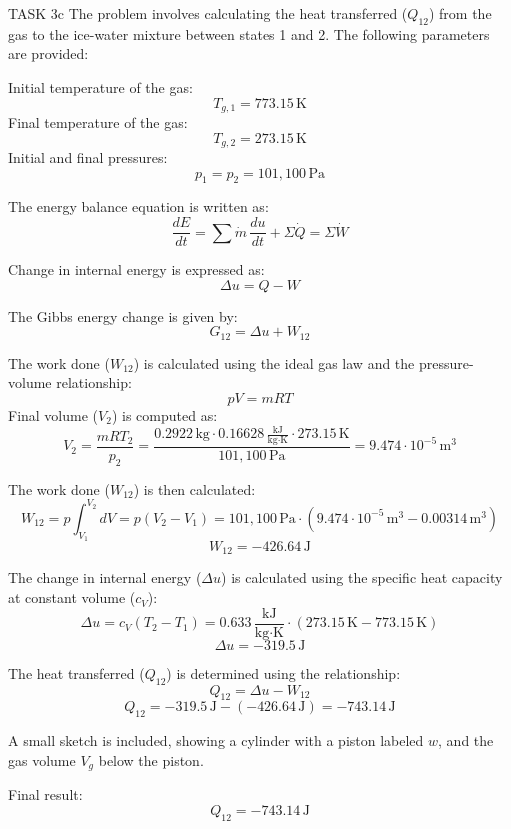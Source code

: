 TASK 3c  
The problem involves calculating the heat transferred (\( Q_{12} \)) from the gas to the ice-water mixture between states 1 and 2. The following parameters are provided:  

Initial temperature of the gas:  
\[
T_{g,1} = 773.15 \, \text{K}
\]  
Final temperature of the gas:  
\[
T_{g,2} = 273.15 \, \text{K}
\]  
Initial and final pressures:  
\[
p_1 = p_2 = 101{,}100 \, \text{Pa}
\]  

The energy balance equation is written as:  
\[
\frac{dE}{dt} = \sum \dot{m} \, \frac{du}{dt} + \Sigma \dot{Q} = \Sigma \dot{W}
\]  

Change in internal energy is expressed as:  
\[
\Delta u = Q - W
\]  

The Gibbs energy change is given by:  
\[
G_{12} = \Delta u + W_{12}
\]  

The work done (\( W_{12} \)) is calculated using the ideal gas law and the pressure-volume relationship:  
\[
pV = mRT
\]  
Final volume (\( V_2 \)) is computed as:  
\[
V_2 = \frac{mRT_2}{p_2} = \frac{0.2922 \, \text{kg} \cdot 0.16628 \, \frac{\text{kJ}}{\text{kg·K}} \cdot 273.15 \, \text{K}}{101{,}100 \, \text{Pa}} = 9.474 \cdot 10^{-5} \, \text{m}^3
\]  

The work done (\( W_{12} \)) is then calculated:  
\[
W_{12} = p \int_{V_1}^{V_2} dV = p(V_2 - V_1) = 101{,}100 \, \text{Pa} \cdot (9.474 \cdot 10^{-5} \, \text{m}^3 - 0.00314 \, \text{m}^3)
\]  
\[
W_{12} = -426.64 \, \text{J}
\]  

The change in internal energy (\( \Delta u \)) is calculated using the specific heat capacity at constant volume (\( c_V \)):  
\[
\Delta u = c_V (T_2 - T_1) = 0.633 \, \frac{\text{kJ}}{\text{kg·K}} \cdot (273.15 \, \text{K} - 773.15 \, \text{K})
\]  
\[
\Delta u = -319.5 \, \text{J}
\]  

The heat transferred (\( Q_{12} \)) is determined using the relationship:  
\[
Q_{12} = \Delta u - W_{12}
\]  
\[
Q_{12} = -319.5 \, \text{J} - (-426.64 \, \text{J}) = -743.14 \, \text{J}
\]  

A small sketch is included, showing a cylinder with a piston labeled \( w \), and the gas volume \( V_g \) below the piston.  

Final result:  
\[
Q_{12} = -743.14 \, \text{J}
\]